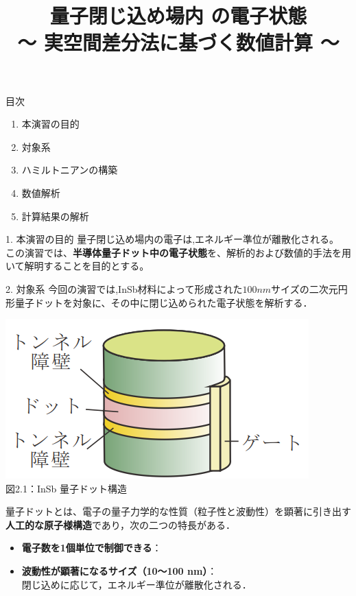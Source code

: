 \documentclass{beamer}
\title{量子閉じ込め場内
の電子状態\\\small ～ 実空間差分法に基づく数値計算 ～}
\begin{document}
\frame{\titlepage}

\begin{frame}{目次}
\begin{enumerate}
  \item 本演習の目的
  \item 対象系
  \item ハミルトニアンの構築
  \item 数値解析
  \item 計算結果の解析
\end{enumerate}
\end{frame}

\begin{frame}{1. 本演習の目的}
量子閉じ込め場内の電子は,エネルギー準位が離散化される。
  この演習では、\textbf{半導体量子ドット中の電子状態}を、解析的および数値的手法を用いて解明することを目的とする。

\end{frame}



\begin{frame}{2. 対象系}
今回の演習では,InSb材料によって形成された$100nm$サイズの二次元円形量子ドットを対象に、その中に閉じ込められた電子状態を解析する．
\begin{center}
  \includegraphics[width=0.5\linewidth]{images/ドット.png} \\
  図2.1：InSb 量子ドット構造
\end{center}

量子ドットとは、電子の量子力学的な性質（粒子性と波動性）を顕著に引き出す\textbf{人工的な原子様構造}であり，次の二つの特長がある．
\begin{itemize}
  \item \textbf{電子数を1個単位で制御できる}：  \\
  \item \textbf{波動性が顕著になるサイズ（10〜100 nm）}：  \\
  \rightarrow 閉じ込めに応じて，エネルギー準位が離散化される．
\end{itemize}




\end{frame}
\end{document}
